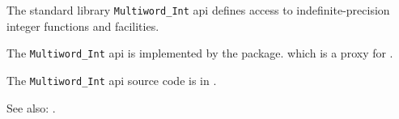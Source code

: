 
The standard library {\tt Multiword\_Int} api defines access to indefinite-precision integer functions and facilities.

The {\tt Multiword\_Int} api is implemented by the  package.
which is a proxy for .

The {\tt Multiword\_Int} api source code is in .

See also:  .





